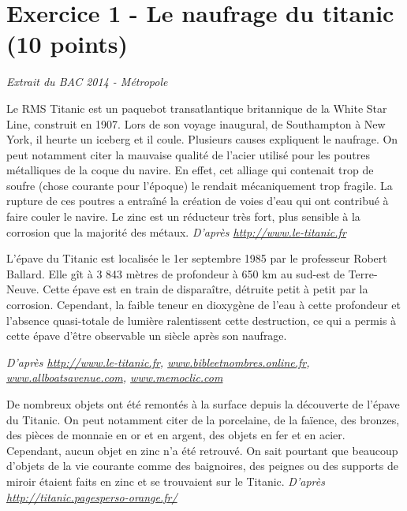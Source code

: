 \documentclass[answers]{exam}
\begin{document}
\section*{Exercice 1 - Le naufrage du titanic (10 points)}

\textit{Extrait du BAC 2014 - Métropole}

\begin{tcolorbox}[colback=white, colframe=gray, coltitle=black, title=\textbf{Document 2}]
  Le RMS Titanic est un paquebot transatlantique britannique de la White Star Line, construit en 1907.  
  Lors de son voyage inaugural, de Southampton à New York, il heurte un iceberg et il coule.  
  Plusieurs causes expliquent le naufrage. On peut notamment citer la mauvaise qualité de l'acier utilisé pour les poutres métalliques de la coque du navire. En effet, cet alliage qui contenait trop de soufre (chose courante pour l'époque) le rendait mécaniquement trop fragile. La rupture de ces poutres a entraîné la création de voies d'eau qui ont contribué à faire couler le navire.  
  Le zinc est un réducteur très fort, plus sensible à la corrosion que la majorité des métaux.
  \textit{D'après \href{http://www.le-titanic.fr}{http://www.le-titanic.fr}}
  \end{tcolorbox}
  
  \begin{tcolorbox}[colback=white, colframe=gray, coltitle=black, title=\textbf{Document 3}]
  L'épave du Titanic est localisée le 1er septembre 1985 par le professeur Robert Ballard.  
  Elle gît à 3 843 mètres de profondeur à 650 km au sud-est de Terre-Neuve. Cette épave est en train de disparaître, détruite petit à petit par la corrosion. Cependant, la faible teneur en dioxygène de l'eau à cette profondeur et l'absence quasi-totale de lumière ralentissent cette destruction, ce qui a permis à cette épave d'être observable un siècle après son naufrage.  
  
  \textit{D'après \href{http://www.le-titanic.fr}{http://www.le-titanic.fr}, \href{http://www.bibleetnombres.online.fr}{www.bibleetnombres.online.fr}, \href{http://www.allboatsavenue.com}{www.allboatsavenue.com}, \href{http://www.memoclic.com}{www.memoclic.com}}
  \end{tcolorbox}
  
  \begin{tcolorbox}[colback=white, colframe=gray, coltitle=black, title=\textbf{Document 4}]
  De nombreux objets ont été remontés à la surface depuis la découverte de l'épave du Titanic.  
  On peut notamment citer de la porcelaine, de la faïence, des bronzes, des pièces de monnaie en or et en argent, des objets en fer et en acier. Cependant, aucun objet en zinc n'a été retrouvé. On sait pourtant que beaucoup d'objets de la vie courante comme des baignoires, des peignes ou des supports de miroir étaient faits en zinc et se trouvaient sur le Titanic.
  \vspace{1em}
  \textit{D'après \href{http://titanic.pagesperso-orange.fr/}{http://titanic.pagesperso-orange.fr/}}
  \end{tcolorbox}
\end{document}
